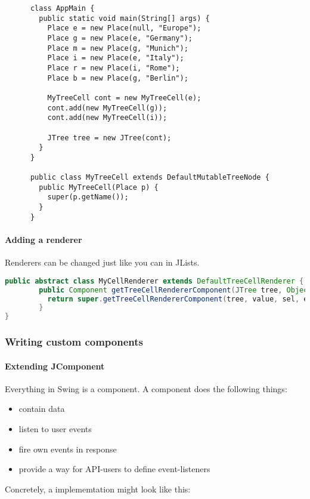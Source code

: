  \begin{lstlisting}
      class AppMain {
        public static void main(String[] args) {
		  Place e = new Place(null, "Europe");
		  Place g = new Place(e, "Germany");
		  Place m = new Place(g, "Munich");
		  Place i = new Place(e, "Italy");
	 	  Place r = new Place(i, "Rome");
		  Place b = new Place(g, "Berlin");
		
		  MyTreeCell cont = new MyTreeCell(e);
		  cont.add(new MyTreeCell(g));
		  cont.add(new MyTreeCell(i));

		  JTree tree = new JTree(cont);
        }
      }
      
      public class MyTreeCell extends DefaultMutableTreeNode {
    	public MyTreeCell(Place p) {
		  super(p.getName());
    	}
      }
 \end{lstlisting}
 
 
 \paragraph{Adding a renderer} Renderers can be changed just like you can in JLists.
 
 \begin{lstlisting}[language=java]
    public abstract class MyCellRenderer extends DefaultTreeCellRenderer {
	    public Component getTreeCellRendererComponent(JTree tree, Object value, boolean sel, boolean expanded, boolean leaf, int row, boolean hasFocus) {
		  return super.getTreeCellRendererComponent(tree, value, sel, expanded, leaf, row, hasFocus);
	    }
}
 \end{lstlisting}
 
 
 
 
 \subsubsection{Writing custom components}
 
 \paragraph{Extending JComponent} Everything in Swing is a component. A component does the following things: 
 \begin{itemize}
    \item contain data
    \item listen to user events
    \item fire own events in response
    \item provide a way for API-users to define event-listeners
 \end{itemize}
 Concretely, a implememtation might look like this: 
 
